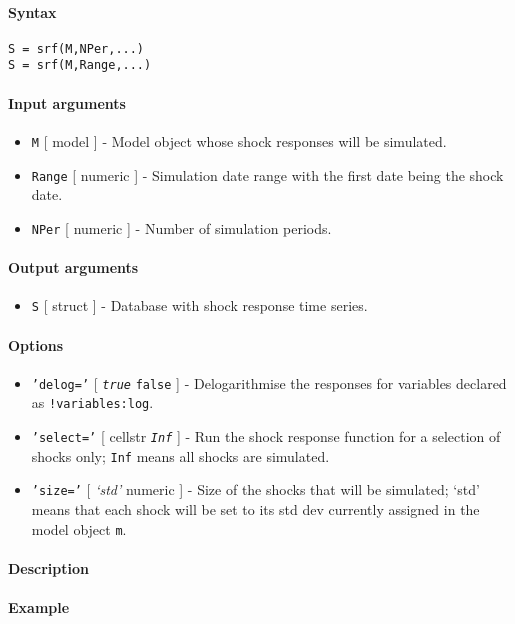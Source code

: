 


	\paragraph{Syntax}\label{syntax}

\begin{verbatim}
S = srf(M,NPer,...)
S = srf(M,Range,...)
\end{verbatim}

\paragraph{Input arguments}\label{input-arguments}

\begin{itemize}
\item
  \texttt{M} {[} model {]} - Model object whose shock responses will be
  simulated.
\item
  \texttt{Range} {[} numeric {]} - Simulation date range with the first
  date being the shock date.
\item
  \texttt{NPer} {[} numeric {]} - Number of simulation periods.
\end{itemize}

\paragraph{Output arguments}\label{output-arguments}

\begin{itemize}
\itemsep1pt\parskip0pt
\item
  \texttt{S} {[} struct {]} - Database with shock response time series.
\end{itemize}

\paragraph{Options}\label{options}

\begin{itemize}
\item
  \texttt{'delog='} {[} \emph{\texttt{true}} \textbar{} \texttt{false}
  {]} - Delogarithmise the responses for variables declared as
  \texttt{!variables:log}.
\item
  \texttt{'select='} {[} cellstr \textbar{} \emph{\texttt{Inf}} {]} -
  Run the shock response function for a selection of shocks only;
  \texttt{Inf} means all shocks are simulated.
\item
  \texttt{'size='} {[} \emph{`std'} \textbar{} numeric {]} - Size of the
  shocks that will be simulated; `std' means that each shock will be set
  to its std dev currently assigned in the model object \texttt{m}.
\end{itemize}

\paragraph{Description}\label{description}

\paragraph{Example}\label{example}


